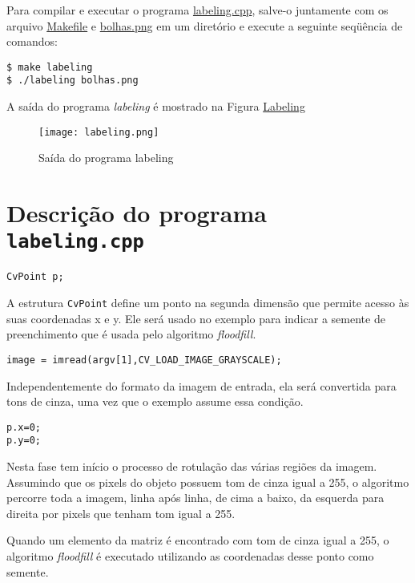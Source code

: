 \documentclass[11pt]{amsbook}
\begin{document}
Para compilar e executar o programa \href{exemplos/labeling.cpp}{labeling.cpp},
salve-o juntamente com os arquivo \href{exemplos/Makefile}{Makefile} e
\href{figs/bolhas.png}{bolhas.png} em um diretório e execute a seguinte seqüência de comandos:


\begin{verbatim}
$ make labeling
$ ./labeling bolhas.png
\end{verbatim}

A saída do programa \emph{labeling} é mostrado na Figura \hyperlink{fig-labeling}{Labeling}


\begin{figure}[h]{}
\centering\texttt{[image: labeling.png]}
\caption{Saída do programa labeling}

\end{figure}

\hypertarget{x-descrição-do-programa-\texttt{labeling.cpp}}{\section{Descrição do programa \texttt{labeling.cpp}}}
\begin{verbatim}
CvPoint p;
\end{verbatim}

A estrutura \texttt{CvPoint} define um ponto na segunda dimensão que permite
acesso às suas coordenadas x e y. Ele será usado no exemplo para
indicar a semente de preenchimento que é usada pelo algoritmo \emph{floodfill}.


\begin{verbatim}
image = imread(argv[1],CV_LOAD_IMAGE_GRAYSCALE);
\end{verbatim}

Independentemente do formato da imagem de entrada, ela será convertida
para tons de cinza, uma vez que o exemplo assume essa condição.


\begin{verbatim}
p.x=0;
p.y=0;
\end{verbatim}

Nesta fase tem início o processo de rotulação das várias regiões da
imagem. Assumindo que os pixels do objeto possuem tom de cinza igual a
255, o algoritmo percorre toda a imagem, linha após linha, de cima a
baixo, da esquerda para direita por pixels que tenham tom igual
a 255.


Quando um elemento da matriz é encontrado com tom de cinza igual a
255, o algoritmo \emph{floodfill} é executado utilizando as coordenadas
desse ponto como semente.
\end{document}

